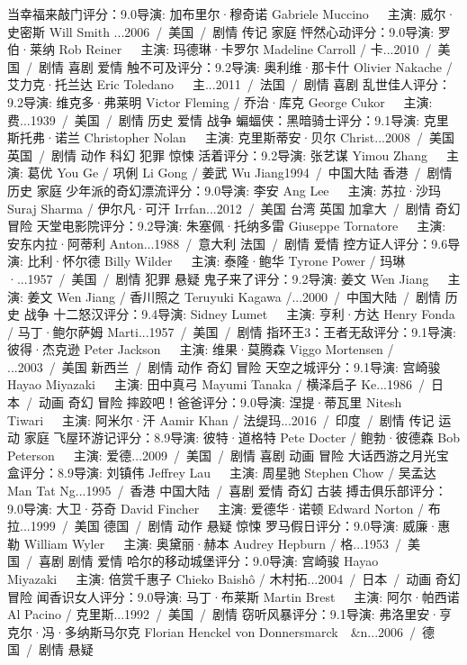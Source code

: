 当幸福来敲门评分：9.0导演: 加布里尔·穆奇诺 Gabriele Muccino   主演: 威尔·史密斯 Will Smith ...2006 / 美国 / 剧情 传记 家庭
怦然心动评分：9.0导演: 罗伯·莱纳 Rob Reiner   主演: 玛德琳·卡罗尔 Madeline Carroll / 卡...2010 / 美国 / 剧情 喜剧 爱情
触不可及评分：9.2导演: 奥利维·那卡什 Olivier Nakache / 艾力克·托兰达 Eric Toledano   主...2011 / 法国 / 剧情 喜剧
乱世佳人评分：9.2导演: 维克多·弗莱明 Victor Fleming / 乔治·库克 George Cukor   主演: 费...1939 / 美国 / 剧情 历史 爱情 战争
蝙蝠侠：黑暗骑士评分：9.1导演: 克里斯托弗·诺兰 Christopher Nolan   主演: 克里斯蒂安·贝尔 Christ...2008 / 美国 英国 / 剧情 动作 科幻 犯罪 惊悚
活着评分：9.2导演: 张艺谋 Yimou Zhang   主演: 葛优 You Ge / 巩俐 Li Gong / 姜武 Wu Jiang1994 / 中国大陆 香港 / 剧情 历史 家庭
少年派的奇幻漂流评分：9.0导演: 李安 Ang Lee   主演: 苏拉·沙玛 Suraj Sharma / 伊尔凡·可汗 Irrfan...2012 / 美国 台湾 英国 加拿大 / 剧情 奇幻 冒险
天堂电影院评分：9.2导演: 朱塞佩·托纳多雷 Giuseppe Tornatore   主演: 安东内拉·阿蒂利 Anton...1988 / 意大利 法国 / 剧情 爱情
控方证人评分：9.6导演: 比利·怀尔德 Billy Wilder   主演: 泰隆·鲍华 Tyrone Power / 玛琳·...1957 / 美国 / 剧情 犯罪 悬疑
鬼子来了评分：9.2导演: 姜文 Wen Jiang   主演: 姜文 Wen Jiang / 香川照之 Teruyuki Kagawa /...2000 / 中国大陆 / 剧情 历史 战争
十二怒汉评分：9.4导演: Sidney Lumet   主演: 亨利·方达 Henry Fonda / 马丁·鲍尔萨姆 Marti...1957 / 美国 / 剧情
指环王3：王者无敌评分：9.1导演: 彼得·杰克逊 Peter Jackson   主演: 维果·莫腾森 Viggo Mortensen / ...2003 / 美国 新西兰 / 剧情 动作 奇幻 冒险
天空之城评分：9.1导演: 宫崎骏 Hayao Miyazaki   主演: 田中真弓 Mayumi Tanaka / 横泽启子 Ke...1986 / 日本 / 动画 奇幻 冒险
摔跤吧！爸爸评分：9.0导演: 涅提·蒂瓦里 Nitesh Tiwari   主演: 阿米尔·汗 Aamir Khan / 法缇玛...2016 / 印度 / 剧情 传记 运动 家庭
飞屋环游记评分：8.9导演: 彼特·道格特 Pete Docter / 鲍勃·彼德森 Bob Peterson   主演: 爱德...2009 / 美国 / 剧情 喜剧 动画 冒险
大话西游之月光宝盒评分：8.9导演: 刘镇伟 Jeffrey Lau   主演: 周星驰 Stephen Chow / 吴孟达 Man Tat Ng...1995 / 香港 中国大陆 / 喜剧 爱情 奇幻 古装
搏击俱乐部评分：9.0导演: 大卫·芬奇 David Fincher   主演: 爱德华·诺顿 Edward Norton / 布拉...1999 / 美国 德国 / 剧情 动作 悬疑 惊悚
罗马假日评分：9.0导演: 威廉·惠勒 William Wyler   主演: 奥黛丽·赫本 Audrey Hepburn / 格...1953 / 美国 / 喜剧 剧情 爱情
哈尔的移动城堡评分：9.0导演: 宫崎骏 Hayao Miyazaki   主演: 倍赏千惠子 Chieko Baishô / 木村拓...2004 / 日本 / 动画 奇幻 冒险
闻香识女人评分：9.0导演: 马丁·布莱斯 Martin Brest   主演: 阿尔·帕西诺 Al Pacino / 克里斯...1992 / 美国 / 剧情
窃听风暴评分：9.1导演: 弗洛里安·亨克尔·冯·多纳斯马尔克 Florian Henckel von Donnersmarck  &n...2006 / 德国 / 剧情 悬疑
